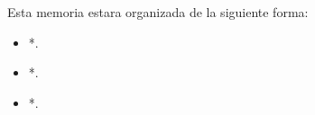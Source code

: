 Esta memoria estara organizada de la siguiente forma:

\begin{itemize}                                                                      
\item *.                                            
\item *.                                                                         
\item *.                                                                        
\end{itemize}


    
